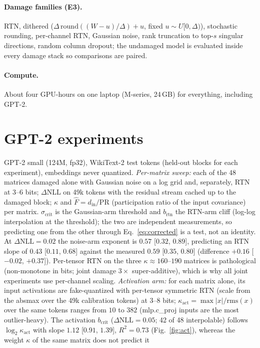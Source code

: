 \documentclass{article}
\begin{document}
\paragraph{Damage families (E3).} RTN, dithered ($\Delta\,\mathrm{round}((W-u)/\Delta)+u$, fixed $u\sim U[0,\Delta)$),
stochastic rounding, per-channel RTN, Gaussian noise, rank truncation to top-$s$ singular directions, random column dropout;
the undamaged model is evaluated inside every damage stack so comparisons are paired.
\paragraph{Compute.} About four GPU-hours on one laptop (M-series, 24\,GB) for everything, including GPT-2.

\section{GPT-2 experiments}
\label{app:lm}
GPT-2 small (124M, fp32), WikiText-2 test tokens (held-out blocks for each experiment), embeddings never quantized.
\emph{Per-matrix sweep:} each of the 48 matrices damaged alone with Gaussian noise on a log grid and, separately, RTN at
3--6 bits; $\Delta$NLL on 49k tokens with the residual stream cached up to the damaged block; $\kappa$ and
$\hat F=d_{\mathrm{in}}/\mathrm{PR}$ (participation ratio of the input covariance) per matrix. $\sigma_{\mathrm{crit}}$ is the
Gaussian-arm threshold and $b_{\mathrm{rtn}}$ the RTN-arm cliff (log-log interpolation at the threshold); the two are
independent measurements, so predicting one from the other through Eq.~\eqref{eq:corrected} is a test, not an identity.
At $\Delta\mathrm{NLL}=0.02$ the noise-arm exponent is $0.57$ [$0.32$, $0.89$], predicting an RTN slope of $0.43$
[$0.11$, $0.68$] against the measured $0.59$ [$0.35$, $0.80$] (difference $+0.16$ [$-0.02$, $+0.37$]). Per-tensor RTN on the three $\kappa\approx160$--$190$ matrices
is pathological (non-monotone in bits; joint damage $3\times$ super-additive), which is why all joint experiments use
per-channel scaling. \emph{Activation arm:} for each matrix alone, its input activations are fake-quantized with per-tensor symmetric
RTN (scale from the absmax over the 49k calibration tokens) at 3--8 bits; $\kappa_{\mathrm{act}} = \max|x|/\mathrm{rms}(x)$
over the same tokens ranges from $10$ to $382$ (mlp.c\_proj inputs are the most outlier-heavy). The activation
$b_{\mathrm{crit}}$ ($\Delta\mathrm{NLL}=0.05$; 42 of 48 interpolable) follows $\log_2\kappa_{\mathrm{act}}$ with slope
$1.12$ [$0.91$, $1.39$], $R^2=0.73$ (Fig.~\ref{fig:act}), whereas the weight $\kappa$ of the same matrix does not predict it
\end{document}
